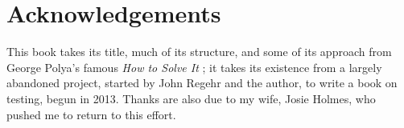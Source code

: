 \chapter{Acknowledgements}

This book takes its title, much of its structure, and some of its approach from George Polya's famous \emph{How to Solve It} \cite{polya2004solve}; it takes its existence from a largely abandoned project, started by John Regehr and the author, to write a book on testing, begun in 2013.  Thanks are also due to my wife, Josie Holmes, who pushed me to return to this effort.